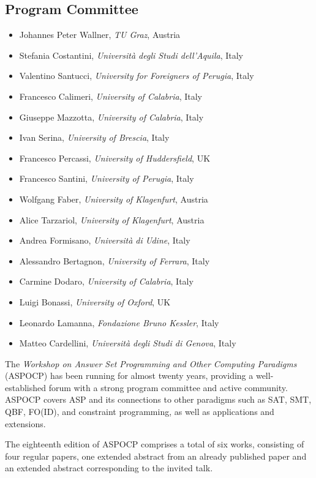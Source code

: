 \documentclass[
]{ceurart}
\begin{document}
\subsection*{Program Committee}
\begin{itemize}
  \item Johannes Peter Wallner, \emph{TU Graz}, Austria
  \item Stefania Costantini, \emph{Università degli Studi dell'Aquila}, Italy
  \item Valentino Santucci, \emph{University for Foreigners of Perugia}, Italy
  \item Francesco Calimeri, \emph{University of Calabria}, Italy
  \item Giuseppe Mazzotta, \emph{University of Calabria}, Italy
  \item Ivan Serina, \emph{University of Brescia}, Italy
  \item Francesco Percassi, \emph{University of Huddersfield}, UK
  \item Francesco Santini, \emph{University of Perugia}, Italy
  \item Wolfgang Faber, \emph{University of Klagenfurt}, Austria
  \item Alice Tarzariol, \emph{University of Klagenfurt}, Austria
  \item Andrea Formisano, \emph{Università di Udine}, Italy
  \item Alessandro Bertagnon, \emph{University of Ferrara}, Italy
  \item Carmine Dodaro, \emph{University of Calabria}, Italy
  \item Luigi Bonassi, \emph{University of Oxford}, UK
  \item Leonardo Lamanna, \emph{Fondazione Bruno Kessler}, Italy
  \item Matteo Cardellini, \emph{Università degli Studi di Genova}, Italy
\end{itemize}



\noindent
The \emph{Workshop on Answer Set Programming and Other Computing Paradigms} (ASPOCP) has been running for almost twenty years, providing a well-established forum with a strong program committee and active community. ASPOCP covers ASP and its connections to other paradigms such as SAT, SMT, QBF, FO(ID), and constraint programming, as well as applications and extensions.

The eighteenth edition of ASPOCP comprises a total of six works, consisting of four regular papers, one extended abstract from an already published paper and an extended abstract corresponding to the invited talk.
\end{document}
